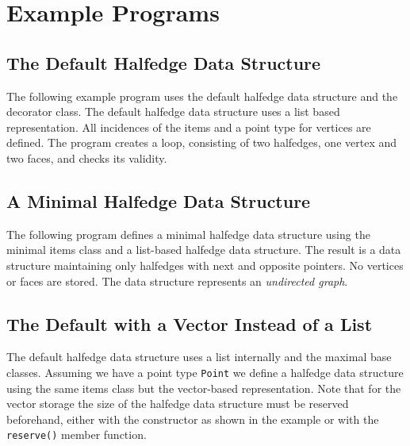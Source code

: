 \section{Example Programs}
\label{sectionHdsExamples}


\subsection{The Default Halfedge Data Structure}

The following example program uses the default halfedge data structure
and the decorator class. The default halfedge data structure uses a
list based representation. All incidences of the items and a point
type for vertices are defined. The program creates a loop, consisting
of two halfedges, one vertex and two faces, and checks its validity.



\subsection{A Minimal Halfedge Data Structure}

The following program defines a minimal halfedge data structure using
the minimal items class  and a
list-based halfedge data structure. The result is a data structure
maintaining only halfedges with next and opposite pointers.  No
vertices or faces are stored. The data structure represents an {\em
  undirected graph}.



\subsection{The Default with a Vector Instead of a List}

The default halfedge data structure uses a list internally and the
maximal base classes. Assuming we have a point type {\tt Point} we
define a halfedge data structure using the same items class but the
vector-based representation.  Note that for the vector storage the
size of the halfedge data structure must be reserved beforehand,
either with the constructor as shown in the example or with the {\tt
  reserve()} member function.


